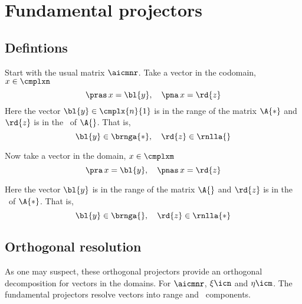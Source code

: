 \section{Fundamental projectors}

\subsection{Defintions}
Start with the usual matrix $\aicmnr$. Take a vector in the codomain, $x\in\cmplxn$
%
\begin{equation}
  \pras \, x = {\bl{ y }}, \quad \pna  \, x = {\rd{ z }}
\end{equation}
%
Here the vector ${\bl{ y }}\in\cmplx{n}{1}$ is in the range of the matrix $\A{*}$ and ${\rd{ z }}$ is in the \ns \ of $\A{}$. That is,
\begin{equation}
  {\bl{ y }} \in \brnga{*}, \quad {\rd{ z }} \in \rnlla{}
\end{equation}

Now take a vector in the domain, $x\in\cmplxm$
%
\begin{equation}
  \pra  \, x  = {\bl{ y }}, \quad \pnas \, x  = {\rd{ z }}
\end{equation}

Here the vector ${\bl{ y }}$ is in the range of the matrix $\A{}$ and ${\rd{ z }}$ is in the \ns \ of $\A{*}$. That is,
%
\begin{equation}
  {\bl{ y }} \in \brnga{}, \quad {\rd{ z }} \in \rnlla{*}
\end{equation}





\subsection{Orthogonal resolution}
As one may suspect, these orthogonal projectors provide an orthogonal decomposition for vectors in the domains. For $\aicmnr$, $\xi\icn$ and $\eta\icm$. The fundamental projectors resolve vectors into range and \ns \ components.

